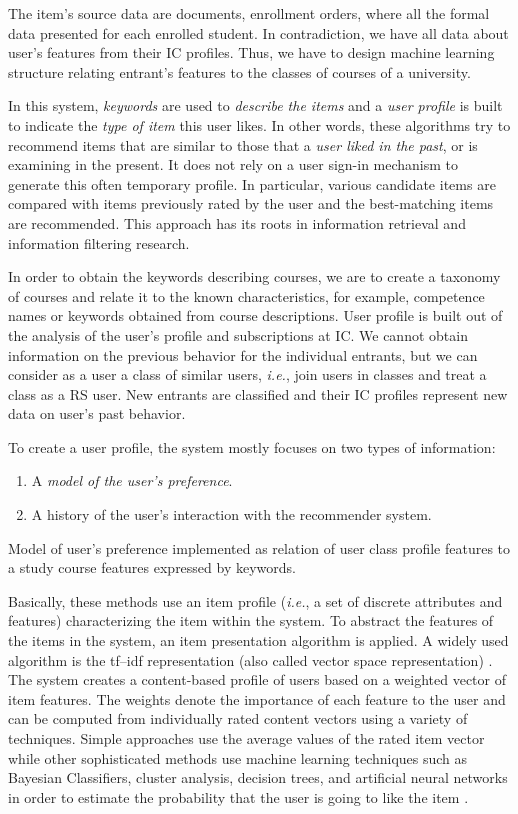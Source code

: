 \documentclass[conference,a4]{IEEEtran}
\begin{document}
The item's source data are documents, enrollment orders, where all the formal data presented for each enrolled student.  In contradiction, we have all data about user's features from their IC profiles.  Thus, we have to design machine learning structure relating entrant's features to the classes of courses of a university.

{%
In this system, \emph{keywords} are used to \emph{describe the items} and a \emph{user profile} is built to indicate the \emph{type of item} this user likes. In other words, these algorithms try to recommend items that are similar to those that a \emph{user liked in the past}, or is examining in the present. It does not rely on a user sign-in mechanism to generate this often temporary profile. In particular, various candidate items are compared with items previously rated by the user and the best-matching items are recommended. This approach has its roots in information retrieval and information filtering research.
}

In order to obtain the keywords describing courses, we are to create a taxonomy of courses and relate it to the known characteristics, for example, competence names or keywords obtained from course descriptions.  User profile is built out of the analysis of the user's profile and subscriptions at IC.  We cannot obtain information on the previous behavior for the individual entrants, but we can consider as a user a class of similar users, \emph{i.e.}, join users in classes and treat a class as a RS user.  New entrants are classified and their IC profiles represent new data on user's past behavior.

{%
To create a user profile, the system mostly focuses on two types of information:
\begin{enumerate}
\item A \emph{model of the user's preference}.
\item A history of the user's interaction with the recommender system.
\end{enumerate}
}

Model of user's preference implemented as relation of user class profile features to a study course features expressed by keywords.

{%
Basically, these methods use an item profile (\emph{i.e.}, a set of discrete attributes and features) characterizing the item within the system. To abstract the features of the items in the system, an item presentation algorithm is applied. A widely used algorithm is the tf–idf representation (also called vector space representation) \cite{wb43}. The system creates a content-based profile of users based on a weighted vector of item features. The weights denote the importance of each feature to the user and can be computed from individually rated content vectors using a variety of techniques. Simple approaches use the average values of the rated item vector while other sophisticated methods use machine learning techniques such as Bayesian Classifiers, cluster analysis, decision trees, and artificial neural networks in order to estimate the probability that the user is going to like the item \cite{wb44}.
}
\end{document}
